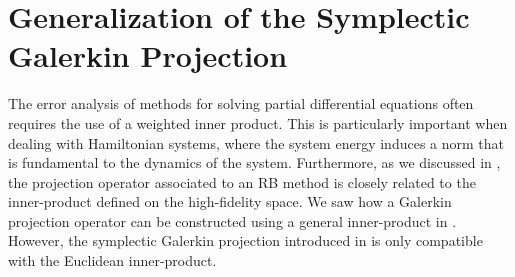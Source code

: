 \section{Generalization of the Symplectic Galerkin Projection} \label{sec:normmor.1}

The error analysis of methods for solving partial differential equations often requires the use of a weighted inner product. This is particularly important when dealing with Hamiltonian systems, where the system energy induces a norm that is fundamental to the dynamics of the system. Furthermore, as we discussed in , the projection operator associated to an RB method is closely related to the inner-product defined on the high-fidelity space. We saw how a Galerkin projection operator can be constructed using a general inner-product in . However, the symplectic Galerkin projection introduced in  is only compatible with the Euclidean inner-product.

